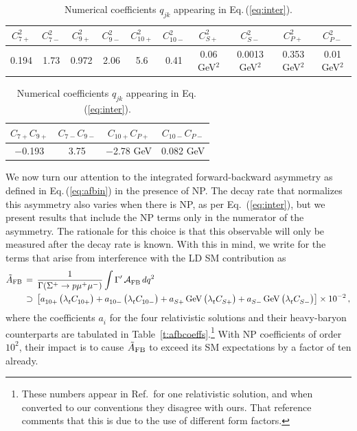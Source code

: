 \documentclass[amsmath,amssymb,aps,nofootinbib,prd,preprint,superscriptaddress,tightenlines,a4paper,bm]{revtex4-2}
\begin{document}
\begin{table}[htp]
\centering \setlength{\tabcolsep}{1ex}
\begin{tabular}{|c|c|c|c|c|c|c|c|c|c|}\hline
$C_{7+}^2$ & $C_{7-}^2$ & $C_{9+}^2$ & $C_{9-}^2$ & $C_{10+}^2$ & $C_{10-}^2$ & $C_{S+}^2$ & $C_{S-}^2$ & $C_{P+}^2$ & $C_{P-}^2$  \\ \hline
0.194& 1.73& 0.972& 2.06& 5.6&0.41& 0.06 GeV$^2$ & 0.0013 GeV$^2$ & 0.353 GeV$^2$ & 0.01 GeV$^2$ \\ \hline
\end{tabular} \smallskip

\begin{tabular}{|c|c|c|c|}\hline
 $C_{7+}C_{9+}$  & $C_{7-}C_{9-}$ &$C_{10+}C_{P+}$ & $C_{10-}C_{P-}$ \\ \hline
$-$0.193& 3.75& $-$2.78 GeV & 0.082 GeV \\ \hline
\end{tabular}
\caption{Numerical coefficients $q_{jk}^{}$ appearing in Eq.\,(\ref{eq:inter}).}
\label{tab:sqbl1}
\end{table}
%

We now turn our attention to the integrated forward-backward asymmetry as defined in Eq.\,(\ref{eq:afbin}) in the presence of NP. The decay rate that normalizes this asymmetry also varies when there is NP, as per Eq.~(\ref{eq:inter}), but we present results that include the NP terms only in the numerator of the asymmetry.
The rationale for this choice is that this observable will only be measured after the decay rate is known.
With this in mind, we write for the terms that arise from interference with the LD SM contribution as
\begin{align}
  {\tilde A}_{\rm FB} & \,=\, \frac{1}{\Gamma(\Sigma^+\to p\mu^+\mu^-)} \int \Gamma'\, {\cal A}_{\rm FB}^{}\, dq^2
  \nonumber \\
  & \,\supset\, \big[ a_{10+}^{}\, \big(\lambda_t^{}C_{10+}^{}\big) + a_{10-}^{}\, \big(\lambda_t^{}C_{10-}^{}\big) + a_{S+}^{}\, {\rm GeV}\, \big(\lambda_t^{}C_{S+}^{}\big) + a_{S-}^{}\, {\rm GeV}\, \big(\lambda_t^{}C_{S-}^{}\big) \big] \times 10^{-2} \,, \label{eq:afbinnp}
\end{align}
where the coefficients $a_i^{}$ for the four relativistic solutions and their heavy-baryon counterparts are tabulated in Table~\ref{t:afbcoeffs}.\footnote{These numbers appear in Ref.\,\cite{Geng:2021fog} for one relativistic solution, and when converted  to our conventions they disagree with ours. That reference comments that this is due to the use of different form factors.}
With NP coefficients of order $10^2$, their impact is to cause ${\tilde A}_{\rm FB}$ to exceed its SM expectations by a factor of ten already.
\end{document}
